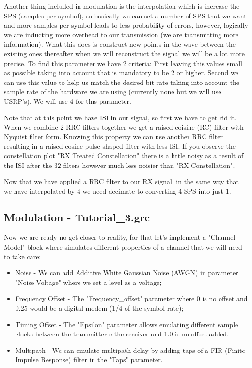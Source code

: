 \documentclass[a4paper, 10pt, conference]{ieeeconf}      %
\begin{document}
    Another thing included in modulation is the interpolation which is increase the SPS (samples per symbol), so basically we can set a number of SPS that we want and more samples per symbol leads to less probability of errors, however, logically we are inducting more overhead to our transmission (we are transmitting more information). What this does is construct new points in the wave between the existing ones thereafter when we will reconstruct the signal we will be a lot more precise. To find this parameter we have 2 criteria:  First leaving this values small as possible taking into account that is mandatory to be 2 or higher. Second we can use this value to help us match the desired bit rate taking into account the sample rate of the hardware we are using (currently none but we will use USRP's). We will use 4 for this parameter.
    
    Note that at this point we have ISI in our signal, so first we have to get rid it. When we combine 2 RRC filters together we get a raised coisine (RC) filter with Nyquist filter form. Knowing this property we can use another RRC filter resulting in a raised cosine pulse shaped filter with less ISI. If you observe the constellation plot "RX Treated Constellation" there is a little noisy as a result of the ISI after the 32 filters however much less noisier than "RX Constellation". 
    
    Now that we have applied a RRC filter to our RX signal, in the same way that we have interpolated by 4 we need decimate to converting 4 SPS into just 1.

\subsection{Modulation - Tutorial\_3.grc}
    Now we are ready no get closer to reality, for that let's implement a "Channel Model" block where simulates different properties of a channel that we will need to take care:
    
\begin{itemize}
\item Noise - We can add Additive White Gaussian Noise (AWGN) in parameter "Noise Voltage" where we set a level as a voltage;
\item Frequency Offset - The "Frequency\_offset" parameter where 0 is no offset and 0.25 would be a digital modem (1/4 of the symbol rate);
\item Timing Offset - The "Epsilon" parameter allows emulating different sample clocks between the transmitter e the receiver and 1.0 is no offset added.
\item Multipath - We can emulate multipath delay by adding taps of a FIR (Finite Impulse Response) filter in the "Taps" parameter.
\end{itemize}
    
\end{document}
